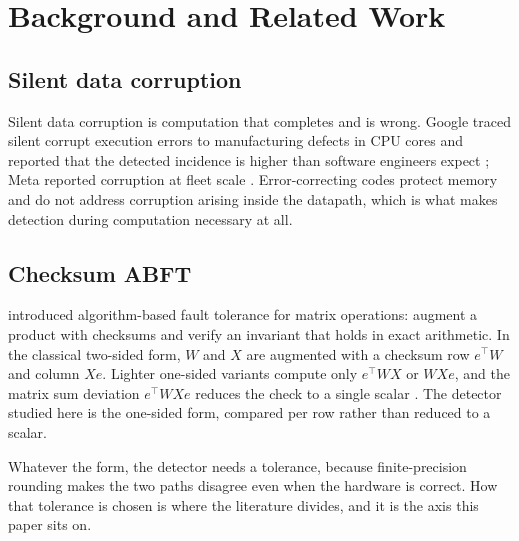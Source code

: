
\section{Background and Related Work}
\label{sec:related}

\subsection{Silent data corruption}

Silent data corruption is computation that completes and is wrong. Google
traced silent corrupt execution errors to manufacturing defects in CPU cores
and reported that the detected incidence is higher than software engineers
expect \citep{hochschild2021cores}; Meta reported corruption at fleet scale
\citep{dixit2021silent}. Error-correcting codes protect memory and do not
address corruption arising inside the datapath, which is what makes detection
during computation necessary at all.

\subsection{Checksum ABFT}

\citet{huang1984abft} introduced algorithm-based fault tolerance for matrix
operations: augment a product with checksums and verify an invariant that holds
in exact arithmetic. In the classical two-sided form, $W$ and $X$ are augmented
with a checksum row $e^{\top}W$ and column $Xe$. Lighter one-sided variants
compute only $e^{\top}WX$ or $WXe$, and the matrix sum deviation
$e^{\top}WXe$ reduces the check to a single scalar
\citep[surveyed in][Sec.~II-C]{xie2025realm}. The detector studied here is the
one-sided form, compared per row rather than reduced to a scalar.

Whatever the form, the detector needs a tolerance, because finite-precision
rounding makes the two paths disagree even when the hardware is correct. How
that tolerance is chosen is where the literature divides, and it is the axis
this paper sits on.

